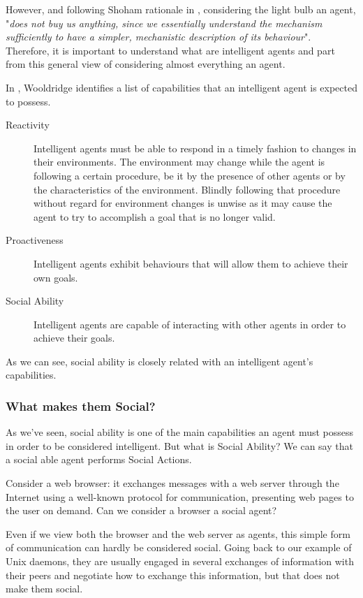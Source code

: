 However, and following Shoham rationale in \cite{shoham:agentorientedprogramming}, considering the light bulb an agent, "\textit{does not buy us anything, since we essentially understand the mechanism sufficiently to have a simpler, mechanistic description of its behaviour}".
Therefore, it is important to understand what are intelligent agents and part from this general view of considering almost everything an agent.

In \cite{wooldridge:multiagent-systems}, Wooldridge identifies a list of capabilities that an intelligent agent is expected to possess.

\begin{description}
	\item[Reactivity] Intelligent agents must be able to respond in a timely fashion to changes in their environments.
	The environment may change while the agent is following a certain procedure, be it by the presence of other agents or by the characteristics of the environment.
	Blindly following that procedure without regard for environment changes is unwise as it may cause the agent to try to accomplish a goal that is no longer valid.
	\item[Proactiveness] Intelligent agents exhibit behaviours that will allow them to achieve their own goals. 
	\item[Social Ability] Intelligent agents are capable of interacting with other agents in order to achieve their goals.
\end{description}

As we can see, social ability is closely related with an intelligent agent's capabilities.

\subsubsection{What makes them Social?}
As we've seen, social ability is one of the main capabilities an agent must possess in order to be considered intelligent.
But what is Social Ability?
We can say that a social able agent performs Social Actions.

Consider a web browser: it exchanges messages with a web server through the Internet using a well-known protocol for communication, presenting web pages to the user on demand.
Can we consider a browser a social agent?

Even if we view both the browser and the web server as agents, this simple form of communication can hardly be considered social.
Going back to our example of Unix daemons, they are usually engaged in several exchanges of information with their peers and negotiate how to exchange this information, but that does not make them social.

